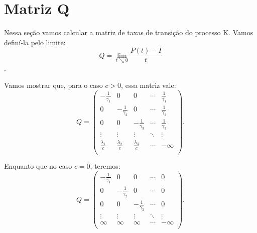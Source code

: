 
\section{Matriz Q}
\label{sec:matrizq}

Nessa seção vamos calcular a matriz de taxas de transição do 
processo K. Vamos definí-la pelo limite:
\begin{displaymath}
  Q = \lim_{t \searrow 0} \frac{P(t) - I}{t} 
\end{displaymath}.

Vamos mostrar que, para o caso $c > 0$, essa matriz vale:
\begin{displaymath}
  Q = \left(
    \begin{array}{ccccc}
      -\frac{1}{\gamma_1} & 0 & 0 & \cdots & \frac{1}{\gamma_1}\\
      0 & -\frac{1}{\gamma_2} & 0 & \cdots & \frac{1}{\gamma_2}\\
      0 & 0 & -\frac{1}{\gamma_3} & \cdots & \frac{1}{\gamma_3}\\
      \vdots & \vdots & \vdots & \ddots & \vdots \\
      \frac{\lambda_1}{c} & \frac{\lambda_2}{c} &
      \frac{\lambda_3}{c} & \cdots & -\infty\\
    \end{array}
  \right).
\end{displaymath}

Enquanto que no caso $c=0$, teremos:
\begin{displaymath}
  Q = \left(
    \begin{array}{ccccc}
      -\frac{1}{\gamma_1} & 0 & 0 & \cdots & 0\\
      0 & -\frac{1}{\gamma_2} & 0 & \cdots & 0\\
      0 & 0 & -\frac{1}{\gamma_3} & \cdots & 0\\
      \vdots & \vdots & \vdots & \ddots & \vdots \\
      \infty & \infty & \infty & \cdots & -\infty\\
    \end{array}
  \right).
\end{displaymath}

